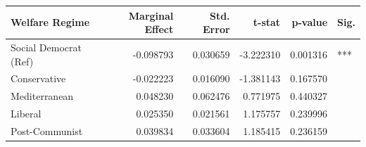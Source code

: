 \begin{tabular}{lrrrrl}
\toprule
Welfare Regime & Marginal Effect & Std. Error & t-stat & p-value & Sig. \\
\midrule
Social Democrat (Ref) & -0.098793 & 0.030659 & -3.222310 & 0.001316 & *** \\
Conservative & -0.022223 & 0.016090 & -1.381143 & 0.167570 &  \\
Mediterranean & 0.048230 & 0.062476 & 0.771975 & 0.440327 &  \\
Liberal & 0.025350 & 0.021561 & 1.175757 & 0.239996 &  \\
Post-Communist & 0.039834 & 0.033604 & 1.185415 & 0.236159 &  \\
\bottomrule
\end{tabular}
